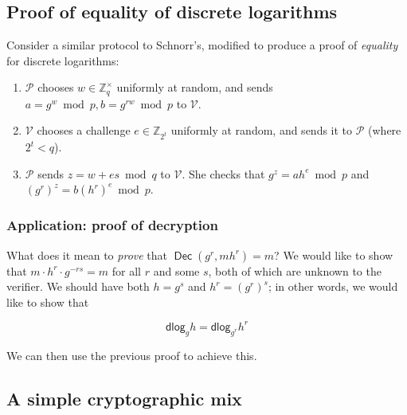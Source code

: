 \documentclass[12pt,a4paper]{article}
\DeclareMathOperator{\Dec}{\mathsf{Dec}}
\newcommand{\dlog}{\mathsf{dlog}}
\theoremstyle{definition}
\newcounter{protocol}
\begin{document}
\subsection{Proof of equality of discrete logarithms}
Consider a similar protocol to Schnorr's, modified to produce a proof of \textit{equality} for discrete logarithms:
\begin{enumerate}
    \item $\mathcal{P}$ chooses $w\in\mathbb{Z}^\times_q$ uniformly at random, and sends $a=g^w\bmod p,b=g^{rw}\bmod p$ to $\mathcal{V}$.
    \item $\mathcal{V}$ chooses a challenge $e\in\mathbb{Z}_{2^t}$ uniformly at random, and sends it to $\mathcal{P}$ (where $2^t<q$).
    \item $\mathcal{P}$ sends $z=w+es\bmod q$ to $\mathcal{V}$. She checks that $g^z=ah^e\bmod p$ and $(g^r)^z=b(h^r)^e\bmod p$.
\end{enumerate}

\subsubsection{Application: proof of decryption}
What does it mean to \textit{prove} that $\Dec(g^r,mh^r)=m$? We would like to show that $m\cdot h^r\cdot g^{-rs}=m$ for all $r$ and some $s$, both of which are unknown to the verifier. We should have both $h=g^s$ and $h^r=(g^r)^s$; in other words, we would like to show that

$$\dlog_g{h}=\dlog_{g^r}{h^r}$$

We can then use the previous proof to achieve this.
\subsection{A simple cryptographic mix}
\newpage
\end{document}
